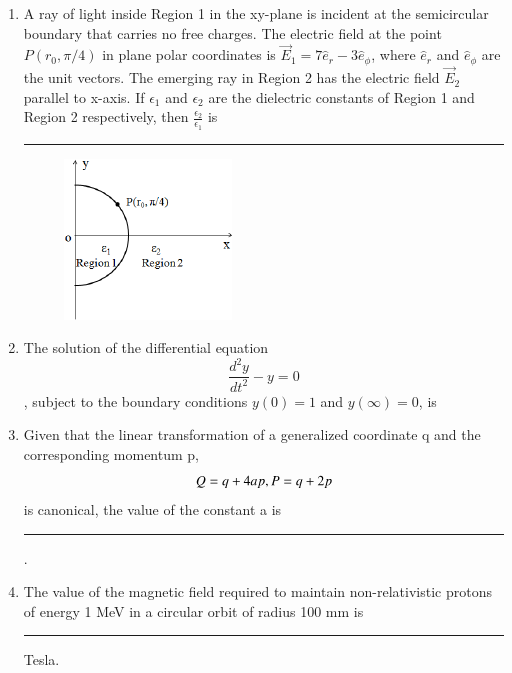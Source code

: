 \documentclass[journal,12pt,onecolumn]{IEEEtran}
\theoremstyle{remark}
\begin{document}
\begin{enumerate}
\item A ray of light inside Region 1 in the xy-plane is incident at the semicircular boundary that carries no free charges. The electric field at the point $P(r_0, \pi/4)$ in plane polar coordinates is $\vec{E}_1 = 7\hat{e}_r - 3\hat{e}_\phi$, where $\hat{e}_r$ and $\hat{e}_\phi$ are the unit vectors. The emerging ray in Region 2 has the electric field $\vec{E}_2$ parallel to x-axis. If $\epsilon_1$ and $\epsilon_2$ are the dielectric constants of Region 1 and Region 2 respectively, then $\frac{\epsilon_2}{\epsilon_1}$ is \rule{5cm}{0.4pt}
\hfill{}
\begin{figure}[H]
\centering
 \caption*{} \label{46} \includegraphics{figs/q46.png}
\end{figure}
\item The solution of the differential equation $$\frac{d^2y}{dt^2} - y = 0$$, subject to the boundary conditions $y(0)=1$ and $y(\infty)=0$, is
\hfill{} \begin{enumerate}  \end{enumerate}

\item Given that the linear transformation of a generalized coordinate q and the corresponding momentum p, $$Q = q + 4ap, \\P = q + 2p$$ is canonical, the value of the constant a is \rule{3cm}{0.4pt}.\hfill{}

\item The value of the magnetic field required to maintain non-relativistic protons of energy 1 MeV in a circular orbit of radius 100 mm is \rule{4cm}{0.4pt} Tesla. \hfill{}


\end{enumerate}
\end{document}
